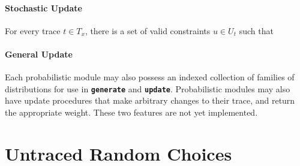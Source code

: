 \documentclass{article}
\newcommand{\code}[1]{\texttt{\small{\textbf{#1}}}}
\newcommand{\dom}[0]{\mbox{dom}}
\begin{document}
\paragraph{Stochastic Update}
For every trace $t \in T_x$, there is a set of valid constraints $u \in U_t$ such that 

\paragraph{General Update}




Each probabilistic module may also possess an indexed collection of families of distributions for use in \code{generate} and \code{update}.
Probabilistic modules may also have update procedures that make arbitrary changes to their trace, and return the appropriate weight.
These two features are not yet implemented.


\section{Untraced Random Choices}



\end{document}
